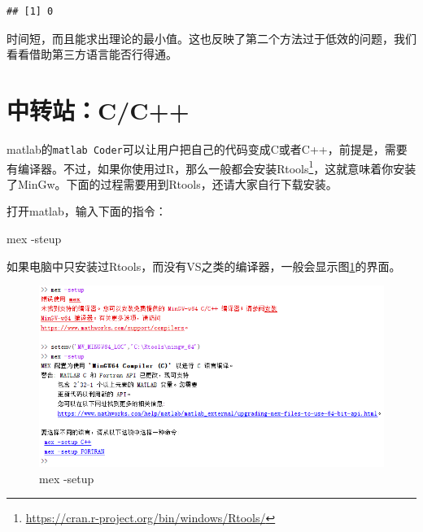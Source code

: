 \documentclass[]{ctexbook}
\newenvironment{Shaded}{\begin{snugshade}}{\end{snugshade}}
\newcommand{\OperatorTok}[1]{\textcolor[rgb]{0.81,0.36,0.00}{\textbf{#1}}}
\newcommand{\NormalTok}[1]{#1}
\renewcommand{\href}[2]{#2\footnote{\url{#1}}}
\begin{document}
\begin{Shaded}
\end{Shaded}

\begin{verbatim}
## [1] 0
\end{verbatim}

时间短，而且能求出理论的最小值。这也反映了第二个方法过于低效的问题，我们看看借助第三方语言能否行得通。

\section{中转站：C/C++}\label{cc}

matlab的\texttt{matlab\ Coder}可以让用户把自己的代码变成C或者C++，前提是，需要有编译器。不过，如果你使用过R，那么一般都会安装\href{https://cran.r-project.org/bin/windows/Rtools/}{Rtools}，这就意味着你安装了MinGw。下面的过程需要用到Rtools，还请大家自行下载安装。

打开matlab，输入下面的指令：

\begin{Shaded}
\begin{Highlighting}[]
\NormalTok{mex -steup}
\end{Highlighting}
\end{Shaded}

如果电脑中只安装过Rtools，而没有VS之类的编译器，一般会显示图\ref{fig:mex}的界面。

\begin{figure}

{\centering \includegraphics[width=0.95\linewidth]{img/mex} 

}

\caption{mex -setup}\label{fig:mex}
\end{figure}
\end{document}
